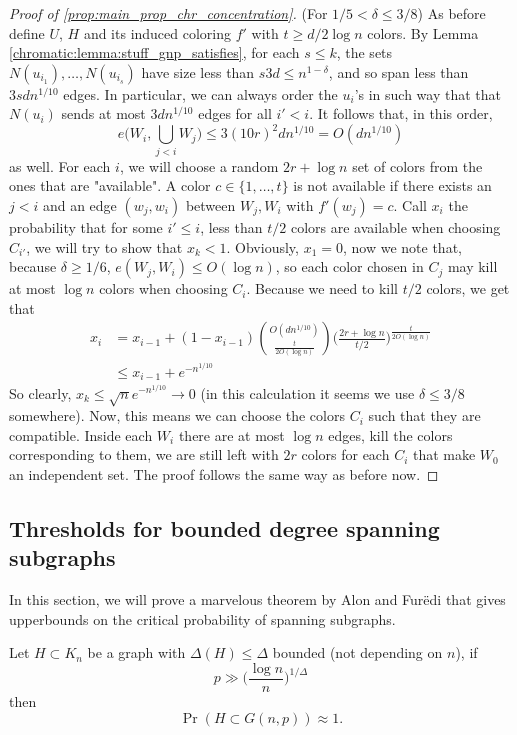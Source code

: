 \begin{proof}[Proof of \ref{prop:main_prop_chr_concentration}]
	(For $1/5 < \delta \leq 3/8$) As before define $U$, $H$ and its
	induced coloring $f'$ with $t \geq d/2\log n$ colors.
	By Lemma \ref{chromatic:lemma:stuff_gnp_satisfies}, for each $s \leq
	k$, the sets $N(u_{i_1}), \dots, N(u_{i_s})$ have size less than
	$s3d \leq n^{1 - \delta}$,
	and so span less than $3sdn^{1/10}$ edges. In particular, we can
	always order the $u_i$'s in such way that that $N(u_i)$ sends at most
	$3dn^{1/10}$ edges for all $i'<i$. It follows that, in this order,
	\[
		e\bigg(W_i, \bigcup_{j < i} W_j\bigg) \leq 3(10r)^2dn^{1/10} = O(dn^{1/10})
	\]
	as well. For each $i$, we will choose a random $2r + \log n$ set of
	colors from the ones that are "available".
	A color $c \in \{1,\dots,t\}$ is not available if there exists an $j
	< i$ and an edge $(w_j, w_i)$ between $W_j, W_i$ with $f'(w_j) = c$.
	Call $x_i$ the probability that for some $i'\leq i$, less than $t/2$
	colors are available when choosing $C_{i'}$, we will try to show that
	$x_k < 1$. Obviously, $x_1 = 0$, now we note that, because $\delta
	\geq 1/6$, $e(W_j, W_i) \leq O(\log n)$, so each color
	chosen in $C_j$ may kill at most $\log n$ colors when choosing $C_i$.
	Because we need to kill $t/2$ colors, we get that
	\begin{align*}
		x_i & = x_{i-1} + (1 - x_{i-1})\binom{O(dn^{1/10})}{\frac{t}{2O(\log
		n)}} \bigg(\frac{2r + \log n}{t/2}\bigg)^{\frac{t}{2O(\log n)}}      \\
		& \leq x_{i-1} + e^{-n^{1/10}}
	\end{align*}
	So clearly, $x_k \leq \sqrt{n}e^{-n^{1/10}} \to 0$ (in this
	calculation it seems we use $\delta \leq 3/8$ somewhere).
	Now, this means we can choose the colors $C_i$ such that they are
	compatible. Inside each $W_i$ there are at most $\log n$ edges,
	kill the colors corresponding to them, we are still left with $2r$
	colors for each $C_i$ that make $W_0$ an independent set.
	The proof follows the same way as before now.
\end{proof}

\subsection{Thresholds for bounded degree spanning subgraphs}
In this section, we will prove a marvelous theorem by Alon and Furëdi
that gives upperbounds
on the critical probability of spanning subgraphs.

\begin{theorem}
	\label{trm:alon_furedi}
	Let $H \subset K_n$ be a graph with $\Delta(H) \leq \Delta$ bounded
	(not depending on $n$),
	if
	\[
		p \gg \bigg(\frac{\log n}{n}\bigg)^{1/\Delta}
	\]
	then
	\[
		\Pr(H \subset G(n,p)) \approx 1.
	\]
\end{theorem}

